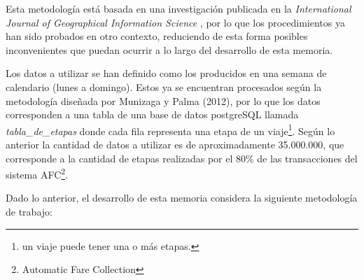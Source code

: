 \documentclass[12pt]{article}
\begin{document}

    Esta metodología está basada en una investigación publicada en la \textit{International Journal of Geographical Information Science} \cite{Estructura_urbana}, por lo que los procedimientos ya han sido probados en otro contexto, reduciendo de esta forma posibles inconvenientes que puedan ocurrir a lo largo del desarrollo de esta memoria. 

    Los datos a utilizar se han definido como los producidos en una semana de calendario (lunes a domingo). Estos ya se encuentran procesados según la metodología diseñada por Munizaga y Palma (2012)\cite{Procesamiento_datos}, por lo que los datos corresponden a una tabla de una base de datos postgreSQL llamada \textit{tabla\_de\_etapas} donde cada fila representa una etapa de un viaje\footnote{un viaje puede tener una o más etapas.}. Según lo anterior la cantidad de datos a utilizar es de aproximadamente 35.000.000, que corresponde a la cantidad de etapas realizadas por el 80\% de las transacciones del sistema AFC\footnote{Automatic Fare Collection}.

    Dado lo anterior, el desarrollo de esta memoria considera la siguiente metodología de trabajo:
\end{document}
